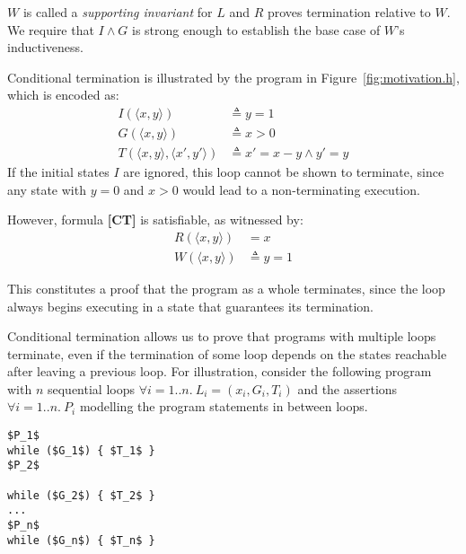 \documentclass[a4paper]{llncs}
\begin{document}
$W$ is called a \emph{supporting invariant} for $L$ and $R$ proves termination relative to $W$.
We require that $I \wedge G$ is strong enough to establish the base case of $W$'s inductiveness.

Conditional termination is illustrated by the program in Figure~\ref{fig:motivation.h},
which is encoded as:
\begin{align*}
            I(\langle x, y \rangle) & \triangleq y = 1 \\
            G(\langle x, y \rangle) & \triangleq x > 0 \\
            T(\langle x, y \rangle, \langle x', y' \rangle) & \triangleq x' = x - y \wedge y' = y 
\end{align*}
If the initial states $I$ are ignored, this loop cannot be shown to terminate, since any state with $y = 0$ and $x > 0$
would lead to a non-terminating execution.

However, formula {\bf [CT]} is satisfiable, as witnessed by:
\begin{align*}
R(\langle x,y\rangle) & = x\\
W(\langle x, y \rangle ) & \triangleq y  = 1
\end{align*}


This constitutes a proof that the program as a whole terminates, since the loop always begins
executing in a state that guarantees its termination.\\



\iffalse

Conditional termination allows us to
prove that programs with multiple loops terminate, even if the termination of some loop depends on the states
reachable after leaving a previous loop.
For illustration, consider the following program with $n$ sequential loops $\forall i=1..n. ~L_i=(x_i,G_i,T_i)$ and
the assertions $\forall i=1..n. ~P_i$ modelling the program statements in between loops. 

\begin{lstlisting}[mathescape=true]
$P_1$
while ($G_1$) { $T_1$ }
$P_2$

while ($G_2$) { $T_2$ }
...
$P_n$
while ($G_n$) { $T_n$ }
\end{lstlisting}
\end{document}
